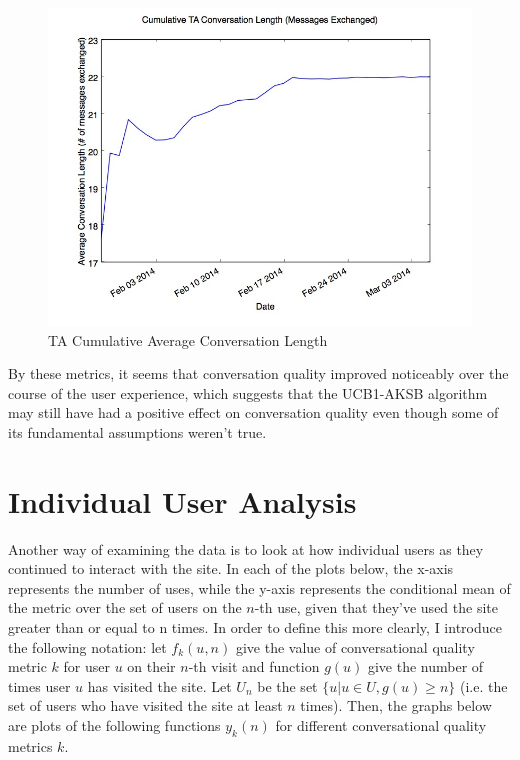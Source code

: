 \begin{figure}[H]
\centering
\includegraphics[trim= 0mm 0mm 0mm 0mm, clip, scale=0.5]{./Figures/CumulativeTAConversationLength(MessagesExchanged).jpg}
\caption{TA Cumulative Average Conversation Length}
\label{fig:TAMessagesExchangedCumulative}
\end{figure}

By these metrics, it seems that conversation quality improved noticeably over the course of the user experience, which suggests that the UCB1-AKSB algorithm may still have had a positive effect on conversation quality even though some of its fundamental assumptions weren't true.

\section{Individual User Analysis}
\label{sec:IndividualUserAnalysis}

Another way of examining the data is to look at how individual users as they continued to interact with the site. In each of the plots below, the x-axis represents the number of uses, while the y-axis represents the conditional mean of the metric over the set of users on the $n$-th use, given that they've used the site greater than or equal to n times. In order to define this more clearly, I introduce the following notation: let $f_k(u, n)$ give the value of conversational quality metric $k$ for user $u$ on their $n$-th visit and function $g(u)$ give the number of times user $u$ has visited the site. Let $U_n$ be the set $\{u | u \in {U}, g(u) \geq{n}\}$ (i.e. the set of users who have visited the site at least $n$ times). Then, the graphs below are plots of the following functions $y_k(n)$ for different conversational quality metrics $k$.


